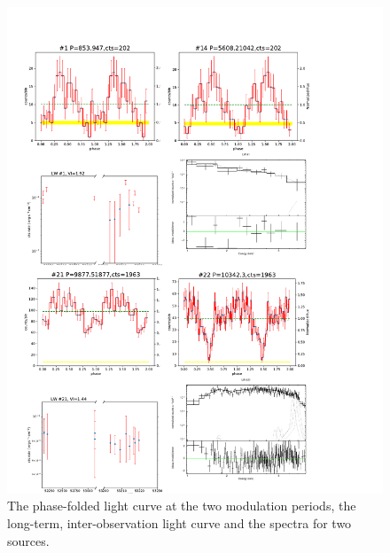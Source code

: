\documentclass[twoside,twocolumn]{aastex63}
\begin{document}
\begin{figure}[!ht]
  \ContinuedFloat
  \captionsetup{list=off,format=cont}
    \centering
    \includegraphics[page=1,scale=0.90,trim=0 0 0 70,clip]{plot_figure_LW_sample.pdf}
    \caption{The phase-folded light curve at the two modulation periods, the long-term, inter-observation light curve and the spectra for two sources.\label{fig:pCV_sample}}
\end{figure}
\end{document}
